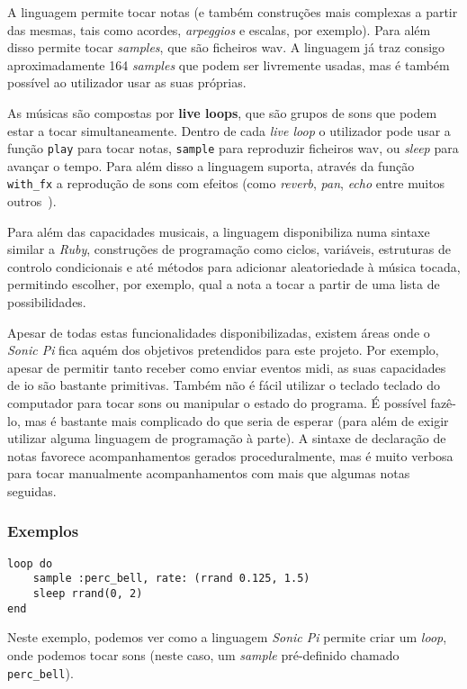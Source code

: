 A linguagem permite tocar notas (e também construções mais complexas a partir das mesmas, tais como acordes, \textit{arpeggios} e escalas, por exemplo). Para além disso permite tocar \textit{samples}, que são ficheiros \acrfull{wav}. A linguagem já traz consigo aproximadamente 164 \textit{samples} que podem ser livremente usadas, mas é também possível ao utilizador usar as suas próprias.

As músicas são compostas por \textbf{live loops}, que são grupos de sons que podem estar a tocar simultaneamente. Dentro de cada \textit{live loop} o utilizador pode usar a função \texttt{play} para tocar notas, \texttt{sample} para reproduzir ficheiros \acrshort{wav}, ou \textit{sleep} para avançar o tempo. Para além disso a linguagem suporta, através da função \texttt{with\_fx} a reprodução de sons com efeitos (como \textit{reverb}, \textit{pan}, \textit{echo} entre muitos outros~\cite{sonic-pi-fx}).

Para além das capacidades musicais, a linguagem disponibiliza numa sintaxe similar a \textit{Ruby}, construções de programação como ciclos, variáveis, estruturas de controlo condicionais e até métodos para adicionar aleatoriedade à música tocada, permitindo escolher, por exemplo, qual a nota a tocar a partir de uma lista de possibilidades.

Apesar de todas estas funcionalidades disponibilizadas, existem áreas onde o \textit{Sonic Pi} fica aquém dos objetivos pretendidos para este projeto. Por exemplo, apesar de permitir tanto receber como enviar eventos \acrshort{midi}, as suas capacidades de \acrfull{io} são bastante primitivas. Também não é fácil utilizar o teclado teclado do computador para tocar sons ou manipular o estado do programa. É possível fazê-lo, mas é bastante mais complicado do que seria de esperar (para além de exigir utilizar alguma linguagem de programação à parte). A sintaxe de declaração de notas favorece acompanhamentos gerados proceduralmente, mas é muito verbosa para tocar manualmente acompanhamentos com mais que algumas notas seguidas.

\subsubsection{Exemplos}
\begin{lstlisting}[caption={Reproduzir um \textit{sample} com valores aleatórios}] 
loop do
    sample :perc_bell, rate: (rrand 0.125, 1.5)
    sleep rrand(0, 2)
end
\end{lstlisting}
Neste exemplo, podemos ver como a linguagem \textit{Sonic Pi} permite criar um \textit{loop}, onde podemos tocar sons (neste caso, um \textit{sample} pré-definido chamado \texttt{perc\_bell}).

